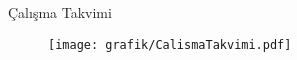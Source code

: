 Çalışma Takvimi
\label{CH:Bolumcalismatakvimi}

\begin{figure}[H]
	\centering
	\texttt{[image: grafik/CalismaTakvimi.pdf]}
   	\label{fig:CalismaTakvimiDM}
\end{figure}

\clearpage